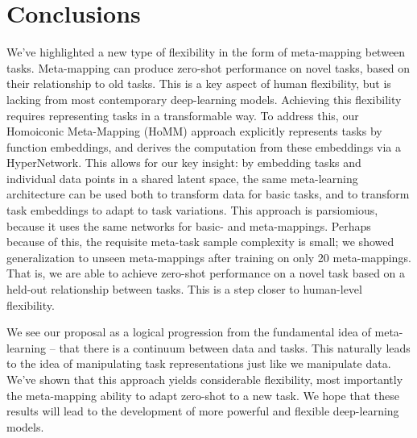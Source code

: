 \documentclass{article}
\begin{document}
\section{Conclusions}
We've highlighted a new type of flexibility in the form of meta-mapping between tasks. Meta-mapping can produce zero-shot performance on novel tasks, based on their relationship to old tasks. This is a key aspect of human flexibility, but is lacking from most contemporary deep-learning models. Achieving this flexibility requires representing tasks in a transformable way. To address this, our Homoiconic Meta-Mapping (HoMM) approach explicitly represents tasks by function embeddings, and derives the computation from these embeddings via a HyperNetwork. This allows for our key insight: by embedding tasks and individual data points in a shared latent space, the same meta-learning architecture can be used both to transform data for basic tasks, and to transform task embeddings to adapt to task variations. This approach is parsiomious, because it uses the same networks for basic- and meta-mappings. Perhaps because of this, the requisite meta-task sample complexity is small; we showed generalization to unseen meta-mappings after training on only 20 meta-mappings. That is, we are able to achieve zero-shot performance on a novel task based on a held-out relationship between tasks. This is a step closer to human-level flexibility.\par
We see our proposal as a logical progression from the fundamental idea of meta-learning -- that there is a continuum between data and tasks. This naturally leads to the idea of manipulating task representations just like we manipulate data. We've shown that this approach yields considerable flexibility, most importantly the meta-mapping ability to adapt zero-shot to a new task. We hope that these results will lead to the development of more powerful and flexible deep-learning models. \par




\newpage

\end{document}
